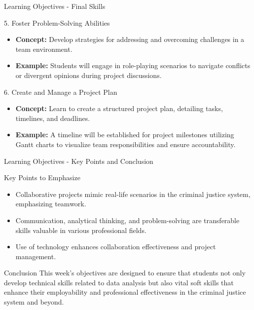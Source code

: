 \documentclass[aspectratio=169]{beamer}
\begin{document}
\begin{frame}[fragile]{Learning Objectives - Final Skills}
    \begin{block}{5. Foster Problem-Solving Abilities}
        \begin{itemize}
            \item \textbf{Concept:} Develop strategies for addressing and overcoming challenges in a team environment.
            \item \textbf{Example:} Students will engage in role-playing scenarios to navigate conflicts or divergent opinions during project discussions.
        \end{itemize}
    \end{block}

    \begin{block}{6. Create and Manage a Project Plan}
        \begin{itemize}
            \item \textbf{Concept:} Learn to create a structured project plan, detailing tasks, timelines, and deadlines.
            \item \textbf{Example:} A timeline will be established for project milestones utilizing Gantt charts to visualize team responsibilities and ensure accountability.
        \end{itemize}
    \end{block}
\end{frame}

\begin{frame}[fragile]{Learning Objectives - Key Points and Conclusion}
    \begin{block}{Key Points to Emphasize}
        \begin{itemize}
            \item Collaborative projects mimic real-life scenarios in the criminal justice system, emphasizing teamwork.
            \item Communication, analytical thinking, and problem-solving are transferable skills valuable in various professional fields.
            \item Use of technology enhances collaboration effectiveness and project management.
        \end{itemize}
    \end{block}

    \begin{block}{Conclusion}
        This week’s objectives are designed to ensure that students not only develop technical skills related to data analysis but also vital soft skills that enhance their employability and professional effectiveness in the criminal justice system and beyond.
    \end{block}
\end{frame}
\end{document}
